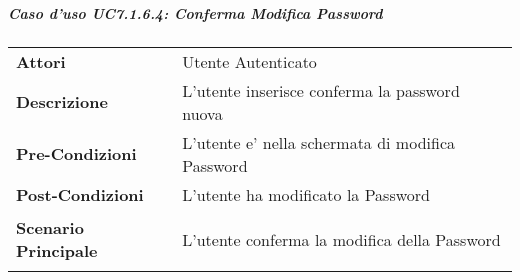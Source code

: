 \subparagraph{Caso d'uso UC7.1.6.4:  Conferma Modifica Password}
\label{UC7_1_6_4}

\begin{tabular}{ l | p{11cm}}
	\hline
	\rowcolor{Gray}
	 \multicolumn{2}{c}{UC7.1.6.4 - Conferma Modifica Password} \\
	 \hline
	\textbf{Attori} & Utente Autenticato \\
	\textbf{Descrizione} & L'utente inserisce conferma la password nuova\\
	\textbf{Pre-Condizioni} & L'utente e' nella schermata di modifica Password\\
	\textbf{Post-Condizioni} & L'utente ha modificato la Password\\
	\textbf{Scenario Principale} & 
	\begin{enumerate*}[label=(\arabic*.),itemjoin={\newline}]
		\item L'utente conferma la modifica della Password
	\end{enumerate*}\\
\end{tabular}